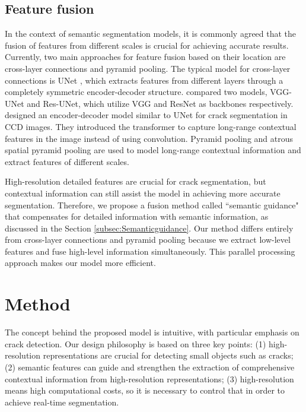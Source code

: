 \documentclass[preprint,12pt,authoryear]{elsarticle}
\begin{document}
\subsection{Feature fusion}
\label{subsec:feature fusion}

In the context of semantic segmentation models, it is commonly agreed that the fusion of features from different scales is crucial for achieving accurate results. Currently, two main approaches for feature fusion based on their location are cross-layer connections and pyramid pooling. The typical model for cross-layer connections is UNet \citep{ronneberger_u-net_2015}, which extracts features from different layers through a completely symmetric encoder-decoder structure.
\citet{huyan_pixelwise_2022} compared two models, VGG-UNet and Res-UNet, which utilize VGG and ResNet as backbones respectively.  
\citet{xu_pavement_2022-2} designed an encoder-decoder model similar to UNet for crack segmentation in CCD images. They introduced the transformer to capture long-range contextual features in the image instead of using convolution. 
Pyramid pooling \citep{liu_deepcrack_2019} and atrous spatial pyramid pooling \citep{sun_dma-net_2022, xu_pixel-level_2021, tang_semantic_2021} are used to model long-range contextual information and extract features of different scales. 

High-resolution detailed features are crucial for crack segmentation, but contextual information can still assist the model in achieving more accurate segmentation. Therefore, we propose a fusion method called ``semantic guidance" that compensates for detailed information with semantic information, as discussed in the Section \ref{subsec:Semanticguidance}. Our method differs entirely from cross-layer connections and pyramid pooling because we extract low-level features and fuse high-level information simultaneously. This parallel processing approach makes our model more efficient. 


\section{Method}
\label{sec:method}



The concept behind the proposed model is intuitive, with particular emphasis on crack detection. Our design philosophy is based on three key points: (1) high-resolution representations are crucial for detecting small objects such as cracks; (2) semantic features can guide and strengthen the extraction of comprehensive contextual information from high-resolution representations; (3) high-resolution means high computational costs, so it is necessary to control that in order to achieve real-time segmentation. 
\end{document}
